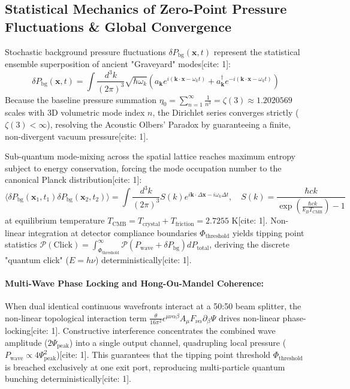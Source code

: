 \documentclass[11pt,a4paper]{article}
\begin{document}
	\subsection{Statistical Mechanics of Zero-Point Pressure Fluctuations \& Global Convergence}
	Stochastic background pressure fluctuations $\delta P_{\text{bg}}(\mathbf{x}, t)$ represent the statistical ensemble superposition of ancient "Graveyard" modes[cite: 1]:
	\begin{equation}
		\delta P_{\text{bg}}(\mathbf{x}, t) = \int \frac{d^3k}{(2\pi)^3} \sqrt{\hbar \omega_k} \left( a_{\mathbf{k}} e^{i(\mathbf{k} \cdot \mathbf{x} - \omega_k t)} + a_{\mathbf{k}}^\dagger e^{-i(\mathbf{k} \cdot \mathbf{x} - \omega_k t)} \right)
	\end{equation}
	Because the baseline pressure summation $\eta_0 = \sum_{n=1}^\infty \frac{1}{n^3} = \zeta(3) \approx 1.2020569$ scales with 3D volumetric mode index $n$, the Dirichlet series converges strictly ($\zeta(3) < \infty$), resolving the Acoustic Olbers' Paradox by guaranteeing a finite, non-divergent vacuum pressure[cite: 1].
	
	Sub-quantum mode-mixing across the spatial lattice reaches maximum entropy subject to energy conservation, forcing the mode occupation number to the canonical Planck distribution[cite: 1]:
	\begin{equation}
		\langle \delta P_{\text{bg}}(\mathbf{x}_1, t_1) \delta P_{\text{bg}}(\mathbf{x}_2, t_2) \rangle = \int \frac{d^3k}{(2\pi)^3} S(k) e^{i \mathbf{k} \cdot \Delta\mathbf{x} - i \omega_k \Delta t}, \quad S(k) = \frac{\hbar c k}{\exp\left(\frac{\hbar c k}{k_B T_{\text{CMB}}}\right) - 1}
	\end{equation}
	at equilibrium temperature $T_{\text{CMB}} = T_{\text{crystal}} + T_{\text{friction}} = 2.7255\text{ K}$[cite: 1]. Non-linear integration at detector compliance boundaries $\Phi_{\text{threshold}}$ yields tipping point statistics $\mathcal{P}(\text{Click}) = \int_{\Phi_{\text{threshold}}}^\infty \mathcal{P}(P_{\text{wave}} + \delta P_{\text{bg}}) d P_{\text{total}}$, deriving the discrete "quantum click" ($E=h\nu$) deterministically[cite: 1].
	
	\paragraph{Multi-Wave Phase Locking and Hong-Ou-Mandel Coherence:}
	When dual identical continuous wavefronts interact at a 50:50 beam splitter, the non-linear topological interaction term $\frac{\theta}{16\pi^2} \epsilon^{\mu\nu\alpha\beta} A_\mu F_{\nu\alpha} \partial_\beta \Psi$ drives non-linear phase-locking[cite: 1]. Constructive interference concentrates the combined wave amplitude ($2\Psi_{\text{peak}}$) into a single output channel, quadrupling local pressure ($P_{\text{wave}} \propto 4\Psi_{\text{peak}}^2$)[cite: 1]. This guarantees that the tipping point threshold $\Phi_{\text{threshold}}$ is breached exclusively at one exit port, reproducing multi-particle quantum bunching deterministically[cite: 1].
	
\end{document}
